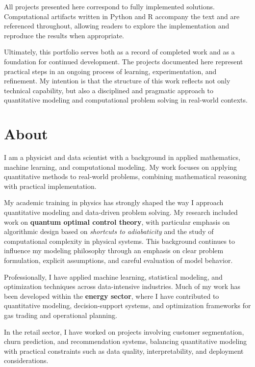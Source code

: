 \documentclass[
  12pt,
  letterpaper,
]{book}
\begin{document}
All projects presented here correspond to fully implemented solutions.
Computational artifacts written in Python and R accompany the text and
are referenced throughout, allowing readers to explore the
implementation and reproduce the results when appropriate.

Ultimately, this portfolio serves both as a record of completed work and
as a foundation for continued development. The projects documented here
represent practical steps in an ongoing process of learning,
experimentation, and refinement. My intention is that the structure of
this work reflects not only technical capability, but also a disciplined
and pragmatic approach to quantitative modeling and computational
problem solving in real-world contexts.


\chapter*{About}\label{about}


I am a physicist and data scientist with a background in applied
mathematics, machine learning, and computational modeling. My work
focuses on applying quantitative methods to real-world problems,
combining mathematical reasoning with practical implementation.

My academic training in physics has strongly shaped the way I approach
quantitative modeling and data-driven problem solving. My research
included work on \textbf{quantum optimal control theory}, with
particular emphasis on algorithmic design based on \emph{shortcuts to
adiabaticity} and the study of computational complexity in physical
systems. This background continues to influence my modeling philosophy
through an emphasis on clear problem formulation, explicit assumptions,
and careful evaluation of model behavior.

Professionally, I have applied machine learning, statistical modeling,
and optimization techniques across data-intensive industries. Much of my
work has been developed within the \textbf{energy sector}, where I have
contributed to quantitative modeling, decision-support systems, and
optimization frameworks for gas trading and operational planning.

In the retail sector, I have worked on projects involving customer
segmentation, churn prediction, and recommendation systems, balancing
quantitative modeling with practical constraints such as data quality,
interpretability, and deployment considerations.
\end{document}
